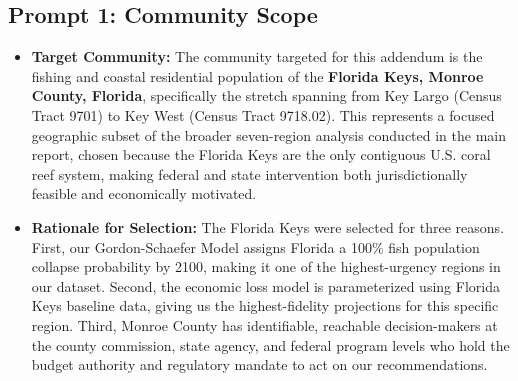 \documentclass[10pt,letterpaper]{article}
\begin{document}
\subsection*{Prompt 1: Community Scope}

\begin{itemize}

    \item \textbf{Target Community:} The community targeted for this addendum is the fishing and coastal residential population of the \textbf{Florida Keys, Monroe County, Florida}, specifically the stretch spanning from Key Largo (Census Tract 9701) to Key West (Census Tract 9718.02). This represents a focused geographic subset of the broader seven-region analysis conducted in the main report, chosen because the Florida Keys are the only contiguous U.S. coral reef system, making federal and state intervention both jurisdictionally feasible and economically motivated.

    \item \textbf{Rationale for Selection:} The Florida Keys were selected for three reasons. First, our Gordon-Schaefer Model assigns Florida a 100\% fish population collapse probability by 2100, making it one of the highest-urgency regions in our dataset. Second, the economic loss model is parameterized using Florida Keys baseline data, giving us the highest-fidelity projections for this specific region. Third, Monroe County has identifiable, reachable decision-makers at the county commission, state agency, and federal program levels who hold the budget authority and regulatory mandate to act on our recommendations.


\end{itemize}
\end{document}
